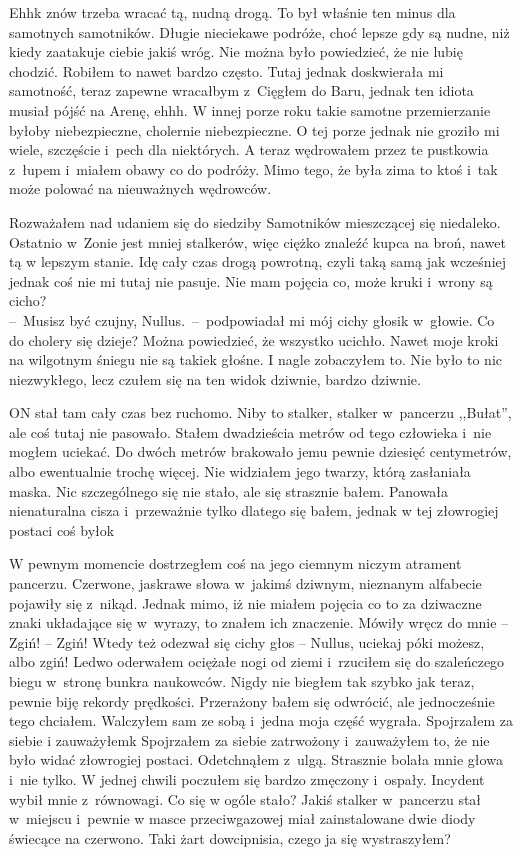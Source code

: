 \documentclass[../MAIN.tex]{subfiles}
\begin{document}
Ehh\3k znów trzeba wracać tą, nudną drogą. To
był właśnie ten minus dla samotnych samotników. Długie
nieciekawe podróże, choć lepsze gdy są nudne, niż kiedy
zaatakuje ciebie jakiś wróg. Nie można było powiedzieć, że nie
lubię chodzić. Robiłem to nawet bardzo często. Tutaj jednak
doskwierała mi samotność, teraz zapewne wracałbym z~Cięgłem do
Baru, jednak ten idiota musiał pójść na Arenę, ehhh. W innej
porze roku takie samotne przemierzanie byłoby niebezpieczne,
cholernie niebezpieczne. O tej porze jednak nie groziło mi
wiele, szczęście i~pech dla niektórych. A teraz wędrowałem
przez te pustkowia z~łupem i~miałem obawy co do podróży. Mimo
tego, że była zima to ktoś i~tak może polować na nieuważnych
\mbox{wędrowców}.

Rozważałem nad udaniem się do siedziby Samotników
mieszczącej się niedaleko. Ostatnio w~Zonie jest mniej
stalkerów, więc ciężko znaleźć kupca na broń, nawet tą w
lepszym stanie. Idę cały czas drogą powrotną, czyli taką samą
jak wcześniej jednak coś nie mi tutaj nie pasuje. Nie mam
pojęcia co, może kruki i~wrony są cicho?
\\
--~Musisz być czujny,
Nullus.~--~podpowiadał mi mój cichy głosik w~głowie. Co do
cholery się dzieje? Można powiedzieć, że wszystko ucichło.
Nawet moje kroki na wilgotnym śniegu nie są takie\3k głośne. I
nagle zobaczyłem to.
Nie było to nic niezwykłego, lecz czułem
się na ten widok dziwnie, bardzo dziwnie.

ON stał tam cały czas
bez ruchomo. Niby to stalker, stalker w~pancerzu ,,Bułat'', ale
coś tutaj nie pasowało. Stałem dwadzieścia metrów od tego
człowieka i~nie mogłem uciekać. Do dwóch metrów brakowało jemu
pewnie dziesięć centymetrów, albo ewentualnie trochę więcej.
Nie widziałem jego twarzy, którą zasłaniała maska. Nic
szczególnego się nie stało, ale się strasznie bałem. Panowała
nienaturalna cisza i~przeważnie tylko dlatego się bałem, jednak
w tej złowrogiej postaci coś było\3k

W pewnym momencie
dostrzegłem coś na jego ciemnym niczym atrament pancerzu.
Czerwone, jaskrawe słowa w~jakimś dziwnym, nieznanym alfabecie
pojawiły się z~nikąd. Jednak mimo, iż nie miałem pojęcia co to
za dziwaczne znaki układające się w~wyrazy, to znałem ich
znaczenie. Mówiły wręcz do mnie – Zgiń! – Zgiń! Wtedy też
odezwał się cichy głos – Nullus, uciekaj póki możesz, albo
zgiń! Ledwo oderwałem ociężałe nogi od ziemi i~rzuciłem się do
szaleńczego biegu w~stronę bunkra naukowców. Nigdy nie biegłem
tak szybko jak teraz, pewnie biję rekordy prędkości. Przerażony
bałem się odwrócić, ale jednocześnie tego chciałem. Walczyłem
sam ze sobą i~jedna moja część wygrała. Spojrzałem za siebie i
zauważyłem\3k
%
%
Spojrzałem za siebie zatrwożony i~zauważyłem to, że nie było
widać złowrogiej postaci. Odetchnąłem z~ulgą. Strasznie bolała
mnie głowa i~nie tylko. W jednej chwili poczułem się bardzo
zmęczony i~ospały. Incydent wybił mnie z~równowagi. Co się w
ogóle stało? Jakiś stalker w~pancerzu stał w~miejscu i~pewnie w
masce przeciwgazowej miał zainstalowane dwie diody świecące na
czerwono. Taki żart dowcipnisia, czego ja się wystraszyłem?
\end{document}
